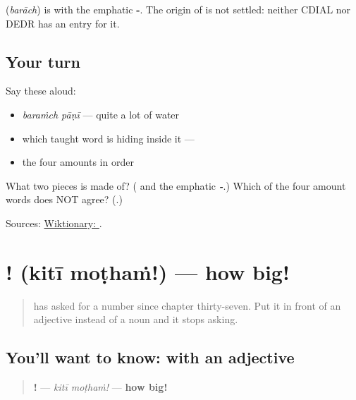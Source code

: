 \begin{cousinweb}
\textbf{} (\emph{barāch}) is \textbf{} with the emphatic \textbf{-}. The origin of \textbf{} is not settled: neither CDIAL nor DEDR has an entry for it.
\end{cousinweb}

\subsection*{Your turn}
Say these aloud:

\begin{itemize}
\raggedright
  \item \emph{baraṁch pāṇī} — quite a lot of water
  \item which taught word is hiding inside it — \emph{\textbf{}}
  \item the four amounts in order
\end{itemize}

\begin{tcolorbox}[breakable,colback=teal!4,colframe=teal!35!black,title={Before you move on}]
What two pieces is \textbf{} made of? (\emph{\textbf{}} and the emphatic \emph{\textbf{-}}.) Which of the four amount words does NOT agree? (\textbf{}.)

Sources: \href{https://en.wiktionary.org/wiki/\%E0\%A4\%AC\%E0\%A4\%B0\%E0\%A4\%BE\%E0\%A4\%9A}{Wiktionary: }.
\end{tcolorbox}
\section[\texorpdfstring{\mr{किती} \mr{मोठं}! (kitī moṭhaṁ!)}{किती मोठं! (kitī moṭhaṁ!)}]{ ! (kitī moṭhaṁ!) — how big!}

\label{lesson:MR-C54-kiti-excl}



\begin{quote}
\textbf{} has asked for a number since chapter thirty-seven. Put it in front of an adjective instead of a noun and it stops asking.
\end{quote}

\subsection*{You'll want to know:  with an adjective}
\begin{quote}
\textbf{ !} — \emph{kitī moṭhaṁ!} — \textbf{how big!}
\end{quote}

